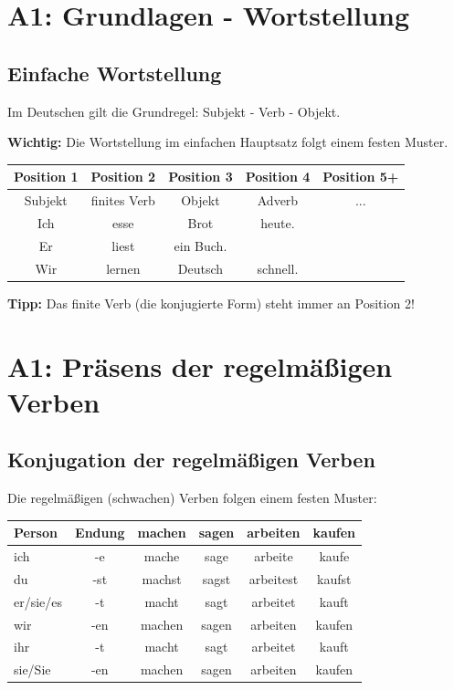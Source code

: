 \chapter{A1: Grundlagen - Wortstellung}
\label{cha:A1Wortstellung}

\section{Einfache Wortstellung}
\label{sec:EinfacheWortstellung}

Im Deutschen gilt die Grundregel: Subjekt - Verb - Objekt.

\bigskip
\noindent\textbf{Wichtig:} Die Wortstellung im einfachen Hauptsatz folgt einem festen Muster.

\begin{center}
\begin{tabular}{|c|c|c|c|c|}
\hline
Position 1 & Position 2 & Position 3 & Position 4 & Position 5+ \\ \hline
Subjekt & finites Verb & Objekt & Adverb & ... \\ \hline
Ich & esse & Brot & heute. & \\ \hline
Er & liest & ein Buch. & & \\ \hline
Wir & lernen & Deutsch & schnell. & \\ \hline
\end{tabular}
\end{center}

\bigskip
\noindent\textbf{Tipp:} Das finite Verb (die konjugierte Form) steht immer an Position 2!

\chapterend

\chapter{A1: Präsens der regelmäßigen Verben}
\label{cha:A1Praesens}

\section{Konjugation der regelmäßigen Verben}

Die regelmäßigen (schwachen) Verben folgen einem festen Muster:

\begin{center}
\begin{tabular}{|l|c|c|c|c|c|}
\hline
Person & Endung & machen & sagen & arbeiten & kaufen \\ \hline
ich & -e & mache & sage & arbeite & kaufe \\ \hline
du & -st & machst & sagst & arbeitest & kaufst \\ \hline
er/sie/es & -t & macht & sagt & arbeitet & kauft \\ \hline
wir & -en & machen & sagen & arbeiten & kaufen \\ \hline
ihr & -t & macht & sagt & arbeitet & kauft \\ \hline
sie/Sie & -en & machen & sagen & arbeiten & kaufen \\ \hline
\end{tabular}
\end{center}

